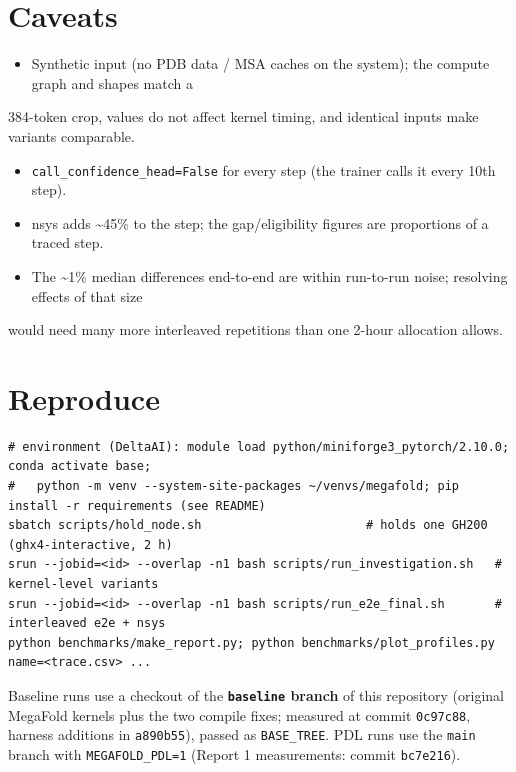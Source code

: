 \documentclass[10pt]{article}
\begin{document}
\section{Caveats}

\begin{itemize}
\item Synthetic input (no PDB data / MSA caches on the system); the compute graph and shapes match a
\end{itemize}
384-token crop, values do not affect kernel timing, and identical inputs make variants comparable.

\begin{itemize}
\item \texttt{call\_confidence\_head=False} for every step (the trainer calls it every 10th step).
\item nsys adds \textasciitilde{}45\% to the step; the gap/eligibility figures are proportions of a traced step.
\item The \textasciitilde{}1\% median differences end-to-end are within run-to-run noise; resolving effects of that size
\end{itemize}
would need many more interleaved repetitions than one 2-hour allocation allows.


\section{Reproduce}

\begin{lstlisting}
# environment (DeltaAI): module load python/miniforge3_pytorch/2.10.0; conda activate base;
#   python -m venv --system-site-packages ~/venvs/megafold; pip install -r requirements (see README)
sbatch scripts/hold_node.sh                       # holds one GH200 (ghx4-interactive, 2 h)
srun --jobid=<id> --overlap -n1 bash scripts/run_investigation.sh   # kernel-level variants
srun --jobid=<id> --overlap -n1 bash scripts/run_e2e_final.sh       # interleaved e2e + nsys
python benchmarks/make_report.py; python benchmarks/plot_profiles.py name=<trace.csv> ...
\end{lstlisting}
Baseline runs use a checkout of the \textbf{\texttt{baseline} branch} of this repository (original MegaFold kernels plus the two compile fixes; measured at commit \texttt{0c97c88}, harness additions in \texttt{a890b55}), passed as \texttt{BASE\_TREE}. PDL runs use the \texttt{main} branch with \texttt{MEGAFOLD\_PDL=1} (Report 1 measurements: commit \texttt{bc7e216}).
\end{document}
